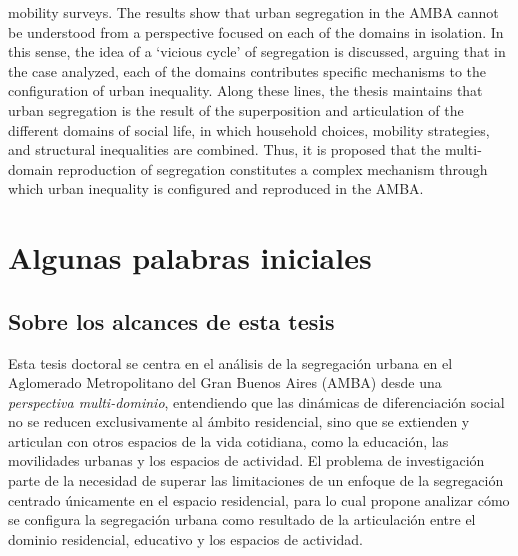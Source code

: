 \documentclass[
  spanish,
  a4paper,%
  chapterprefix=true,%
  DIV=calc,%
  twoside]{scrbook}%
\begin{document}
mobility surveys. The results show that urban segregation in the AMBA cannot be
understood from a perspective focused on each of the domains in isolation. In
this sense, the idea of a `vicious cycle' of segregation is discussed, arguing
that in the case analyzed, each of the domains contributes specific mechanisms
to the configuration of urban inequality. Along these lines, the thesis maintains
that urban segregation is the result of the superposition and articulation of the
different domains of social life, in which household choices, mobility
strategies, and structural inequalities are combined. Thus, it is proposed that
the multi-domain reproduction of segregation constitutes a complex mechanism
through which urban inequality is configured and reproduced in the AMBA.

\newpage
{
\setcounter{tocdepth}{1}
\tableofcontents
}
\listoffigures
\listoftables
\chapter*{Algunas palabras iniciales}\label{algunas-palabras-iniciales}

\section*{Sobre los alcances de esta tesis}\label{sobre-los-alcances-de-esta-tesis}

Esta tesis doctoral se centra en el análisis de la segregación urbana en el Aglomerado Metropolitano del Gran Buenos Aires (AMBA) desde una \emph{perspectiva multi-dominio}, entendiendo que las dinámicas de diferenciación social no se reducen exclusivamente al ámbito residencial, sino que se extienden y articulan con otros espacios de la vida cotidiana, como la educación, las movilidades urbanas y los espacios de actividad. El problema de investigación parte de la necesidad de superar las limitaciones de un enfoque de la segregación centrado únicamente en el espacio residencial, para lo cual propone analizar cómo se configura la segregación urbana como resultado de la articulación entre el dominio residencial, educativo y los espacios de actividad.
\end{document}
